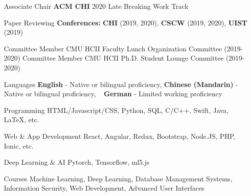 
\begin{cvskills}
  \cvskill
    {Associate Chair} %
    {
      \textbf{ACM CHI} 2020 Late Breaking Work Track
    } 

  \cvskill
    {Paper Reviewing} %
    {
      \textbf{Conferences:} \textbf{CHI} (2019, 2020), \textbf{CSCW} (2019, 2020), \textbf{UIST} (2019)
    } 

\end{cvskills}

\begin{cvskills}
  \cvskill
    {Committee Member} %
    {
      CMU HCII Faculty Lunch Organization Committee (2019-2020)
    } 
  \cvskill
    {Committee Member} %
    {
      CMU HCII Ph.D. Student Lounge Committee (2019-2020)
    } 

\end{cvskills}







\begin{cvskills}
  \cvskill
    {Languages} %
    {\textbf{English} - Native or bilingual proficiency, \textbf{Chinese (Mandarin)} - Native or bilingual proficiency, } 
  \cvskill
    {~} %
    {\textbf{German} - Limited working proficiency} 
  
  \cvskill
    {Programming} %
    {HTML/Javascript/CSS, Python, SQL, C/C++, Swift, Java, LaTeX, etc. } 

  \cvskill
    {Web \& App Development} %
    {React, Angular, Redux, Bootstrap, Node.JS, PHP, Ionic, etc.} 

  \cvskill
    {Deep Learning \& AI}
    {Pytorch, Tensorflow, ml5.js} 

  \cvskill
    {Courses} %
    {Machine Learning, Deep Learning, Database Management Systems, Information Security, Web Development, Advanced User Interfaces} 
\end{cvskills}
